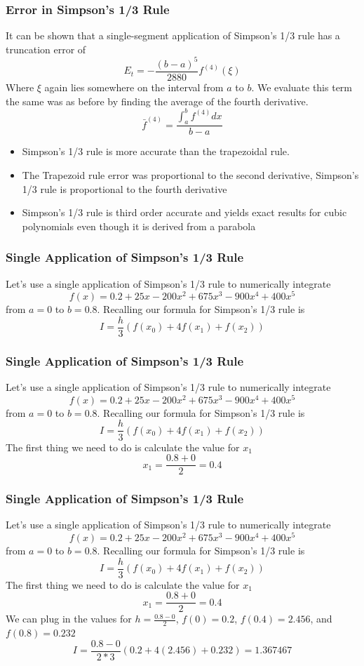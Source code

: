 \documentclass{if-beamer}
\begin{document}
\begin{frame}
	\frametitle{Error in Simpson's 1/3 Rule}
	It can be shown that a single-segment application of Simpson’s 1/3 rule has a truncation error of 
	$$E_t = -\frac{(b-a)^5}{2880}f^{(4)}(\xi)$$
	Where $\xi$ again lies somewhere on the interval from $a$ to $b$. We evaluate this term the same was as before by finding the average of the fourth derivative.
	$$ \bar{f}^{(4)} = \frac{\int_{a}^{b}f^{(4)}dx}{b-a}$$
	\begin{itemize}
		\item Simpson’s 1/3 rule is more accurate than the trapezoidal rule.
		\item The Trapezoid rule error was proportional to the second derivative, Simpson's 1/3 rule is proportional to the fourth derivative
		\item Simpson's 1/3 rule is third order accurate and yields exact results for cubic polynomials even though it is derived from a parabola
	\end{itemize}
\end{frame}

\begin{frame}
	\frametitle{Single Application of Simpson’s 1/3 Rule}
	Let's use a single application of Simpson's 1/3 rule to numerically integrate
	$$f(x) =0.2+25x-200x^2+675x^3-900x^4+400x^5$$
	from $a = 0$ to $b=0.8$.
	Recalling our formula for Simpson's 1/3 rule is
	$$ I =\frac{h}{3}(f(x_0)+4f(x_1)+f(x_2))$$
\end{frame}

\begin{frame}
	\frametitle{Single Application of Simpson’s 1/3 Rule}
	Let's use a single application of Simpson's 1/3 rule to numerically integrate
	$$f(x) =0.2+25x-200x^2+675x^3-900x^4+400x^5$$
	from $a = 0$ to $b=0.8$.
	Recalling our formula for Simpson's 1/3 rule is
	$$ I =\frac{h}{3}(f(x_0)+4f(x_1)+f(x_2))$$
	The first thing we need to do is calculate the value for $x_1$
	$$x_1 = \frac{0.8+0}{2} = 0.4$$
\end{frame}

\begin{frame}
	\frametitle{Single Application of Simpson’s 1/3 Rule}
	Let's use a single application of Simpson's 1/3 rule to numerically integrate
	$$f(x) =0.2+25x-200x^2+675x^3-900x^4+400x^5$$
	from $a = 0$ to $b=0.8$.
	Recalling our formula for Simpson's 1/3 rule is
	$$ I =\frac{h}{3}(f(x_0)+4f(x_1)+f(x_2))$$
	The first thing we need to do is calculate the value for $x_1$
	$$x_1 = \frac{0.8+0}{2} = 0.4$$
	We can plug in the values for $h= \frac{0.8-0}{2}$, $f(0) = 0.2$, $f(0.4) =2.456$, and $f(0.8) = 0.232$
	$$ I = \frac{0.8-0}{2*3}(0.2+4(2.456)+0.232) = 1.367467$$
\end{frame}
\end{document}
